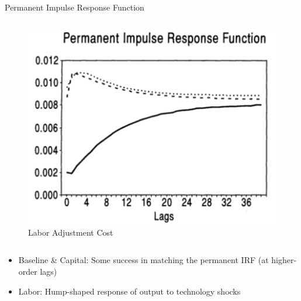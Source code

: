 \documentclass[10pt]{beamer}
\begin{document}
\begin{frame}{Permanent Impulse Response Function}
\begin{columns}[T,onlytextwidth]
        \begin{figure}
            \centering
            \includegraphics[width=\linewidth]{figures/L_per_IRF.png}
            \centering\caption{Labor Adjustment Cost}
        \end{figure}
    \end{columns}

    \begin{itemize}
        \item Baseline \& Capital: Some success in matching the permanent IRF (at
              higher-order lags)
        \item Labor: Hump-shaped response of output to technology shocks
    \end{itemize}

\end{frame}
\end{document}
